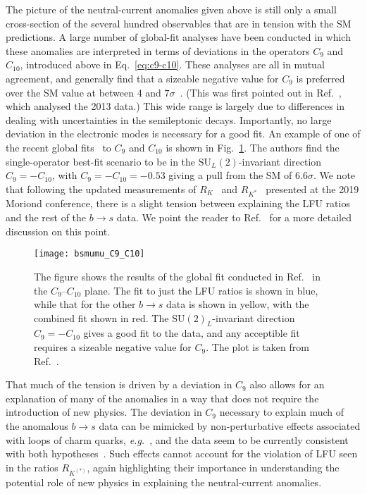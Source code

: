 The picture of the neutral-current anomalies given above is still only a small
cross-section of the several hundred observables that are in tension with the SM
predictions. A large number of global-fit analyses have been conducted in which
these anomalies are interpreted in terms of deviations in the operators $C_{9}$
and $C_{10}$, introduced above in Eq.~\eqref{eq:c9-c10}. These analyses are all
in mutual agreement, and generally find that a sizeable negative value for
$C_{9}$ is preferred over the SM value at between 4 and
$7\sigma$~\cite{Aebischer:2019mlg, Alguero:2019ptt, Arbey:2019duh,
  Ciuchini:2019usw}. (This was first pointed out in
Ref.~\cite{Descotes-Genon:2013wba}, which analysed the 2013 data.) This wide
range is largely due to differences in dealing with uncertainties in the
semileptonic decays. Importantly, no large deviation in the electronic modes is
necessary for a good fit. An example of one of the recent global
fits~\cite{Aebischer:2019mlg} to $C_{9}$ and $C_{10}$ is shown in
Fig.~\ref{fig:c9-c10-fit}. The authors find the single-operator best-fit
scenario to be in the $\mathrm{SU}_{L}(2)$-invariant direction
$C_{9} = -C_{10}$, with $C_{9} = -C_{10} = -0.53$ giving a pull from the SM of
$6.6\sigma$. We note that following the updated measurements of
$R_{K}$~\cite{Aaij:2019wad} and $R_{K^{*}}$~\cite{Abdesselam:2019wac} presented
at the 2019 Moriond conference, there is a slight tension between explaining the
LFU ratios and the rest of the $b\to s$ data. We point the reader to
Ref.~\cite{Aebischer:2019mlg} for a more detailed discussion on this point.

\begin{figure}[t]
  \centering
  \texttt{[image: bsmumu\_C9\_C10]}
  \caption{The figure shows the results of the global fit conducted in
    Ref.~\cite{Aebischer:2019mlg} in the $C_{9}$--$C_{10}$ plane. The fit to
    just the LFU ratios is shown in blue, while that for the other $b\to s$ data
    is shown in yellow, with the combined fit shown in red. The
    $\mathrm{SU}(2)_{L}$-invariant direction $C_{9}=-C_{10}$ gives a good fit to
    the data, and any acceptible fit requires a sizeable negative value for
    $C_{9}$. The plot is taken from Ref.~\cite{Aebischer:2019mlg}.}
  \label{fig:c9-c10-fit}
\end{figure}

That much of the tension is driven by a deviation in $C_{9}$ also allows for an
explanation of many of the anomalies in a way that does not require the
introduction of new physics. The deviation in $C_{9}$ necessary to explain much
of the anomalous $b \to s$ data can be mimicked by non-perturbative effects
associated with loops of charm quarks, \textit{e.g.}~\cite{Blake:2017wjz}, and
the data seem to be currently consistent with both
hypotheses~\cite{Altmannshofer:2015sma, Descotes-Genon:2015uva}. Such effects
cannot account for the violation of LFU seen in the ratios $R_{K^{(*)}}$, again
highlighting their importance in understanding the potential role of new physics
in explaining the neutral-current anomalies.

